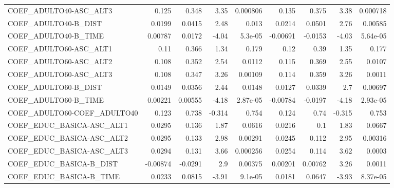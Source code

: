 \begin{tabular}{lrrrrrrrr}
COEF\_ADULTO40-ASC\_ALT3            &       0.125 &        0.348 &     3.35 & 0.000806 &      0.135 &       0.375 &         3.38 &      0.000718 \\
COEF\_ADULTO40-B\_DIST              &      0.0199 &       0.0415 &     2.48 &    0.013 &     0.0214 &      0.0501 &         2.76 &       0.00585 \\
COEF\_ADULTO40-B\_TIME              &     0.00787 &       0.0172 &    -4.04 &  5.3e-05 &   -0.00691 &     -0.0153 &        -4.03 &      5.64e-05 \\
COEF\_ADULTO60-ASC\_ALT1            &        0.11 &        0.366 &     1.34 &    0.179 &       0.12 &        0.39 &         1.35 &         0.177 \\
COEF\_ADULTO60-ASC\_ALT2            &       0.108 &        0.352 &     2.54 &   0.0112 &      0.115 &       0.369 &         2.55 &        0.0107 \\
COEF\_ADULTO60-ASC\_ALT3            &       0.108 &        0.347 &     3.26 &  0.00109 &      0.114 &       0.359 &         3.26 &        0.0011 \\
COEF\_ADULTO60-B\_DIST              &      0.0149 &       0.0356 &     2.44 &   0.0148 &     0.0127 &      0.0339 &          2.7 &       0.00697 \\
COEF\_ADULTO60-B\_TIME              &     0.00221 &      0.00555 &    -4.18 & 2.87e-05 &   -0.00784 &     -0.0197 &        -4.18 &      2.93e-05 \\
COEF\_ADULTO60-COEF\_ADULTO40       &       0.123 &        0.738 &   -0.314 &    0.754 &      0.124 &        0.74 &       -0.315 &         0.753 \\
COEF\_EDUC\_BASICA-ASC\_ALT1         &      0.0295 &        0.136 &     1.87 &   0.0616 &     0.0216 &         0.1 &         1.83 &        0.0667 \\
COEF\_EDUC\_BASICA-ASC\_ALT2         &      0.0295 &        0.133 &     2.98 &  0.00291 &     0.0245 &       0.112 &         2.95 &       0.00316 \\
COEF\_EDUC\_BASICA-ASC\_ALT3         &      0.0294 &        0.131 &     3.66 & 0.000256 &     0.0254 &       0.114 &         3.62 &        0.0003 \\
COEF\_EDUC\_BASICA-B\_DIST           &    -0.00874 &      -0.0291 &      2.9 &  0.00375 &    0.00201 &     0.00762 &         3.26 &        0.0011 \\
COEF\_EDUC\_BASICA-B\_TIME           &      0.0233 &       0.0815 &    -3.91 &  9.1e-05 &     0.0181 &      0.0647 &        -3.93 &      8.37e-05 \\

\end{tabular}
